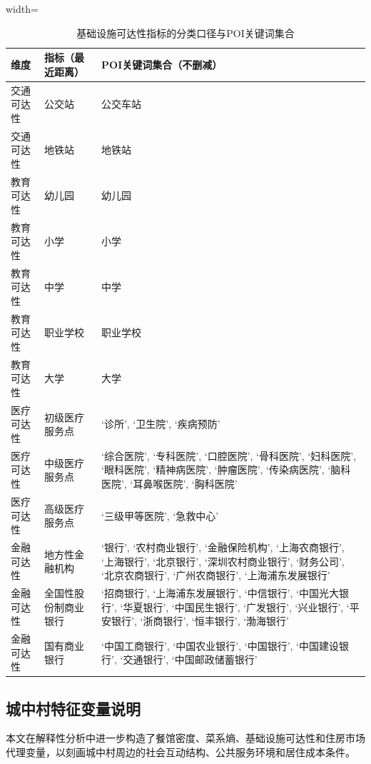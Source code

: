 \documentclass[a4paper,12pt]{report}
\begin{document}
\begin{table}[H]
\centering
\caption{基础设施可达性指标的分类口径与POI关键词集合}
\label{tab:infra_access}
\begin{adjustbox}{width=\textwidth}
\begin{tabular}{p{3.2cm} p{3.2cm} p{7.9cm}}
\toprule
维度 & 指标（最近距离） & POI关键词集合（不删减） \\
\midrule
交通可达性 & 公交站 & 公交车站 \\
交通可达性 & 地铁站 & 地铁站 \\
\midrule
教育可达性 & 幼儿园 & 幼儿园 \\
教育可达性 & 小学 & 小学 \\
教育可达性 & 中学 & 中学 \\
教育可达性 & 职业学校 & 职业学校 \\
教育可达性 & 大学 & 大学 \\
\midrule
医疗可达性 & 初级医疗服务点 & `诊所', `卫生院', `疾病预防' \\
医疗可达性 & 中级医疗服务点 & `综合医院', `专科医院', `口腔医院', `骨科医院', `妇科医院', `眼科医院', `精神病医院', `肿瘤医院', `传染病医院', `脑科医院', `耳鼻喉医院', `胸科医院' \\
医疗可达性 & 高级医疗服务点 & `三级甲等医院', `急救中心' \\
\midrule
金融可达性 & 地方性金融机构 & `银行', `农村商业银行', `金融保险机构', `上海农商银行', `上海银行', `北京银行', `深圳农村商业银行', `财务公司', `北京农商银行', `广州农商银行', `上海浦东发展银行' \\
金融可达性 & 全国性股份制商业银行 & `招商银行', `上海浦东发展银行', `中信银行', `中国光大银行', `华夏银行', `中国民生银行', `广发银行', `兴业银行', `平安银行', `浙商银行', `恒丰银行', `渤海银行' \\
金融可达性 & 国有商业银行 & `中国工商银行', `中国农业银行', `中国银行', `中国建设银行', `交通银行', `中国邮政储蓄银行' \\
\bottomrule
\end{tabular}
\end{adjustbox}
\end{table}

\subsection{城中村特征变量说明}
本文在解释性分析中进一步构造了餐馆密度、菜系熵、基础设施可达性和住房市场代理变量，以刻画城中村周边的社会互动结构、公共服务环境和居住成本条件。
\end{document}
